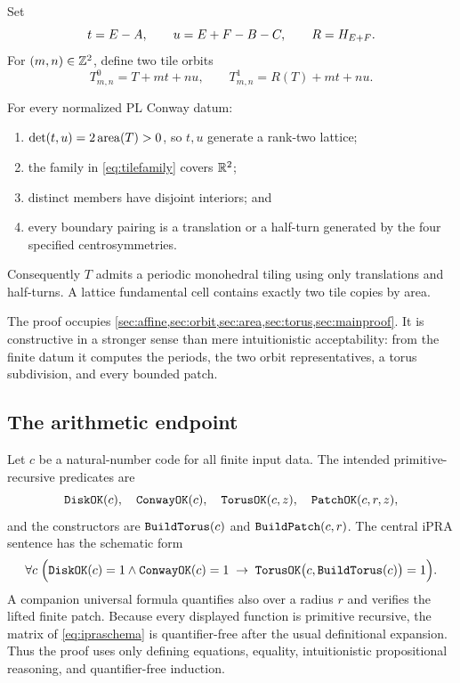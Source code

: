 Set
\begin{equation}
  t=E-A,
  \qquad
  u=E+F-B-C,
  \qquad
  R=H_{E+F}.
  \label{eq:periods}
\end{equation}
For \((m,n)\in\mathbb Z^2\), define two tile orbits
\begin{equation}
 T^0_{m,n}=T+mt+nu,
 \qquad
 T^1_{m,n}=R(T)+mt+nu.
 \label{eq:tilefamily}
\end{equation}

\begin{theorem}
\label{thm:mainPL}
For every normalized PL Conway datum:
\begin{enumerate}[label=(\alph*)]
\item \(\det(t,u)=2\operatorname{area}(T)>0\), so \(t,u\) generate a rank-two lattice;
\item the family in \cref{eq:tilefamily} covers \(\mathbb R^2\);
\item distinct members have disjoint interiors; and
\item every boundary pairing is a translation or a half-turn generated by the four specified centrosymmetries.
\end{enumerate}
Consequently \(T\) admits a periodic monohedral tiling using only translations and half-turns.  A lattice fundamental cell contains exactly two tile copies by area.
\end{theorem}

The proof occupies \cref{sec:affine,sec:orbit,sec:area,sec:torus,sec:mainproof}.  It is constructive in a stronger sense than mere intuitionistic acceptability: from the finite datum it computes the periods, the two orbit representatives, a torus subdivision, and every bounded patch.

\subsection{The arithmetic endpoint}

Let \(c\) be a natural-number code for all finite input data.  The intended primitive-recursive predicates are
\[
 \texttt{DiskOK}(c),\quad \texttt{ConwayOK}(c),\quad
 \texttt{TorusOK}(c,z),\quad \texttt{PatchOK}(c,r,z),
\]
and the constructors are \(\texttt{BuildTorus}(c)\) and \(\texttt{BuildPatch}(c,r)\).  The central iPRA sentence has the schematic form
\begin{equation}
 \forall c\;\Bigl(
  \texttt{DiskOK}(c)=1\wedge\texttt{ConwayOK}(c)=1
  \;\to\;
  \texttt{TorusOK}\bigl(c,\texttt{BuildTorus}(c)\bigr)=1
 \Bigr).
 \label{eq:ipraschema}
\end{equation}
A companion universal formula quantifies also over a radius \(r\) and verifies the lifted finite patch.  Because every displayed function is primitive recursive, the matrix of \cref{eq:ipraschema} is quantifier-free after the usual definitional expansion.  Thus the proof uses only defining equations, equality, intuitionistic propositional reasoning, and quantifier-free induction.

